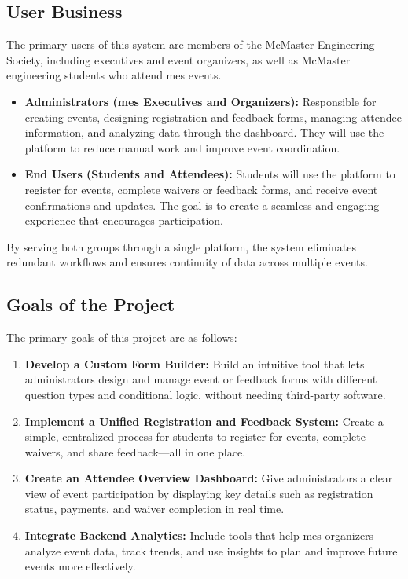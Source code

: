 \documentclass[12pt]{article}
\begin{document}
\subsection{User Business}

The primary users of this system are members of the McMaster Engineering Society, including executives and event
organizers, as well as McMaster engineering students who attend \gls{mes} events.

\begin{itemize}
    \item \textbf{Administrators (\gls{mes} Executives and Organizers):} Responsible for creating events, designing
      registration and feedback forms, managing attendee information, and analyzing data through the dashboard. They
      will use the platform to reduce manual work and improve event coordination.
    \item \textbf{End Users (Students and Attendees):} Students will use the platform to register for events, complete
      waivers or feedback forms, and receive event confirmations and updates. The goal is to create a seamless and
      engaging experience that encourages participation.
\end{itemize}

By serving both groups through a single platform, the system eliminates redundant workflows and ensures continuity of
data across multiple events.

\subsection{Goals of the Project}

The primary goals of this project are as follows:

\begin{enumerate}
    \item \textbf{Develop a Custom Form Builder:} Build an intuitive tool that lets administrators design and manage
      event or feedback forms with different question types and conditional logic, without needing third-party software.
    \item \textbf{Implement a Unified Registration and Feedback System:} Create a simple, centralized process for
      students to register for events, complete waivers, and share feedback—all in one place.
    \item \textbf{Create an Attendee Overview Dashboard:} Give administrators a clear view of event participation by
      displaying key details such as registration status, payments, and waiver completion in real time.
    \item \textbf{Integrate Backend Analytics:} Include tools that help \gls{mes} organizers analyze event data, track
      trends, and use insights to plan and improve future events more effectively.
\end{enumerate}
\end{document}

